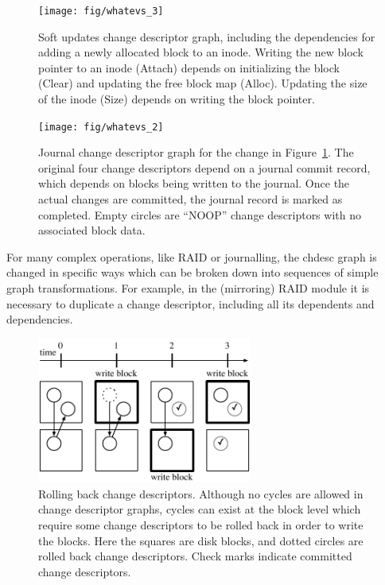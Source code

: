\begin{figure}[b]
  \centering
  \texttt{[image: fig/whatevs\_3]}%
  \caption{\label{fig:softupdates} Soft updates change descriptor graph,
  including the dependencies for adding a newly allocated block to an
  inode. Writing the new block pointer to an inode (Attach) depends on
  initializing the block (Clear) and updating the free block map (Alloc).
  Updating the size of the inode (Size) depends on writing the block
  pointer.}
\end{figure}

\begin{figure}
  \centering
  \texttt{[image: fig/whatevs\_2]}%
  \caption{\label{fig:journal} Journal change descriptor graph for the
  change in Figure~\ref{fig:softupdates}.  The original four change
  descriptors depend on a journal commit record, which depends on blocks
  being written to the journal.  Once the actual changes are committed, the
  journal record is marked as completed.  Empty circles are ``NOOP'' change
  descriptors with no associated block data.  }
\end{figure}

For many complex operations, like RAID or journalling, the chdesc graph is
changed in specific ways which can be broken down into sequences of simple graph
transformations. For example, in the (mirroring) RAID module it is necessary to
duplicate a change descriptor, including all its dependents and dependencies.



\begin{figure}
  \centering
  \includegraphics[width=200pt]{rollback_sequence}
  \caption{\label{fig:rollback} Rolling back change descriptors. Although no
  cycles are allowed in change descriptor graphs, cycles can exist at the block
  level which require some change descriptors to be rolled back in order to
  write the blocks. Here the squares are disk blocks, and dotted circles are
  rolled back change descriptors. Check marks indicate committed change
  descriptors.
}
\end{figure}
